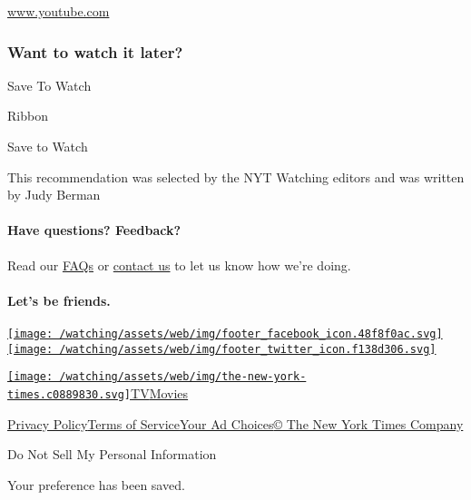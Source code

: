 \href{http://www.youtube.com}{www.youtube.com}

\hypertarget{want-to-watch-it-later}{%
\subsubsection{Want to watch it later?}\label{want-to-watch-it-later}}

Save To Watch

Ribbon

Save to Watch

This recommendation was selected by the NYT Watching editors and was
written by Judy Berman

\hypertarget{have-questions-feedback}{%
\paragraph{Have questions? Feedback?}\label{have-questions-feedback}}

Read our \href{//www.nytimes.com/2017/01/10/watching/faq.html}{FAQs} or
\href{mailto:watchingcare@nytimes.com}{contact us} to let us know how
we're doing.

\hypertarget{lets-be-friends}{%
\paragraph{Let's be friends.}\label{lets-be-friends}}

\href{https://www.facebook.com/nytwatching/}{\texttt{[image: /watching/assets/web/img/footer\_facebook\_icon.48f8f0ac.svg]}}\href{https://twitter.com/watching}{\texttt{[image: /watching/assets/web/img/footer\_twitter\_icon.f138d306.svg]}}

\href{//www.nytimes.com}{\texttt{[image: /watching/assets/web/img/the-new-york-times.c0889830.svg]}}\href{//www.nytimes.com/section/arts/television}{TV}\href{//www.nytimes.com/section/movies}{Movies}

\href{//www.nytimes.com/content/help/rights/privacy/policy/privacy-policy.html}{Privacy
Policy}\href{//www.nytimes.com/content/help/rights/terms/terms-of-service.html}{Terms
of
Service}\href{//www.nytimes.com/content/help/rights/privacy/policy/privacy-policy.html\#pp}{Your
Ad Choices}\href{http://www.nytco.com/}{© The New York Times Company}

Do Not Sell My Personal Information

Your preference has been saved.
